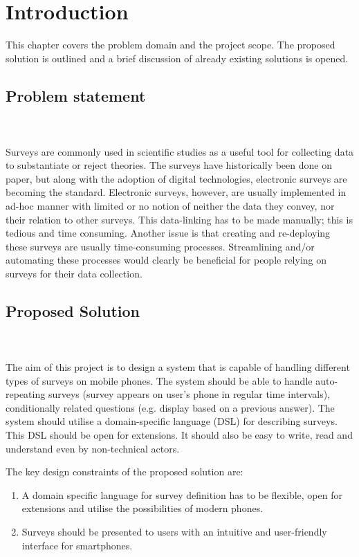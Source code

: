 \chapter{Introduction}
\label{chap:introduction}
This chapter covers the problem domain and the project scope. The proposed solution is outlined and a brief discussion of already existing solutions is opened.

\section{Problem statement}
\label{sec:problemstatement}
\kim \\\\
Surveys are commonly used in scientific studies as a useful tool for collecting data to substantiate or reject theories. The surveys have historically been done on paper, but along with the adoption of digital technologies, electronic surveys are becoming the standard.
Electronic surveys, however, are usually implemented in ad-hoc manner with limited or no notion of neither the data they convey, nor their relation to other surveys. This data-linking has to be made manually; this is tedious and time consuming. Another issue is that creating and re-deploying these surveys are usually time-consuming processes.
Streamlining and/or automating these processes would clearly be beneficial for people relying on surveys for their data collection.

\section{Proposed Solution}
\label{sec:proposedsolution}
\anna \\\\
The aim of this project is to design a system that is capable of handling different types of surveys on mobile phones. The system should be able to handle auto-repeating surveys (survey appears on user's phone in regular time intervals), conditionally related questions (e.g. display based on a previous answer).
The system should utilise a domain-specific language (DSL) for describing surveys. This DSL should be open for extensions. It should also be easy to write, read and understand even by non-technical actors.

The key design constraints of the proposed solution are:

\begin{enumerate}
  \item A domain specific language for survey definition has to be flexible, open for extensions and utilise the possibilities of modern phones.
  \item Surveys should be presented to users with an intuitive and user-friendly interface for smartphones.
\end{enumerate}

